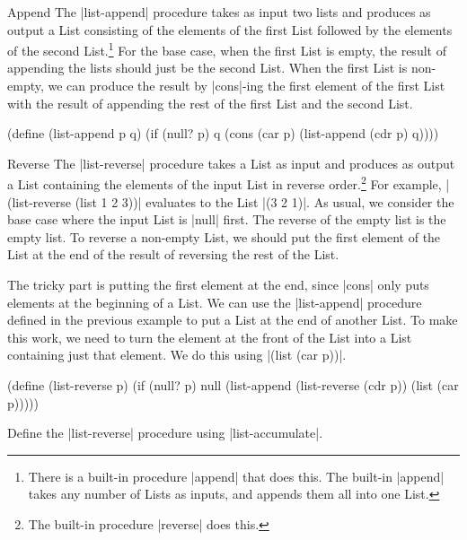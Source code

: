 \begin{schemeregion}
\begin{examplenobar}{Append}\label{example:append} The \scheme|list-append| procedure takes as input two lists and produces as output a List consisting of the elements of the first List followed by the elements of the second List.\footnote{There is a built-in procedure \scheme|append| that does this.  The built-in \scheme|append| takes any number of Lists as inputs, and appends them all into one List.}  For the base case, when the first List is empty, the result of appending the lists should just be the second List.  When the first List is non-empty, we can produce the result by \scheme|cons|-ing the first element of the first List with the result of appending the rest of the first List and the second List.
\begin{schemedisplay}
(define (list-append p q)
  (if (null? p) q
      (cons (car p) (list-append (cdr p) q))))
\end{schemedisplay}
\end{examplenobar}

\begin{examplenobar}{Reverse} The \scheme|list-reverse| procedure takes a List as input and produces as output a List containing the elements of the input List in reverse order.\footnote{The built-in procedure \scheme|reverse| does this.}  For example, \scheme|(list-reverse (list 1 2 3))| evaluates to the List \schemeresult|(3 2 1)|.  As usual, we consider the base case where the input List is \schemeresult|null| first.  The reverse of the empty list is the empty list.  To reverse a non-empty List, we should put the first element of the List at the end of the result of reversing the rest of the List.  

The tricky part is putting the first element at the end, since \scheme|cons| only puts elements at the beginning of a List.  We can use the \scheme|list-append| procedure defined in the previous example to put a List at the end of another List.  To make this work, we need to turn the element at the front of the List into a List containing just that element.  We do this using \scheme|(list (car p))|.

\begin{schemedisplay}
(define (list-reverse p)
  (if (null? p) null 
      (list-append (list-reverse (cdr p)) (list (car p)))))
\end{schemedisplay}

\begin{exercise} \greenstar
Define the \scheme|list-reverse| procedure using \scheme|list-accumulate|.
\end{exercise}


\end{examplenobar}
\end{schemeregion}
